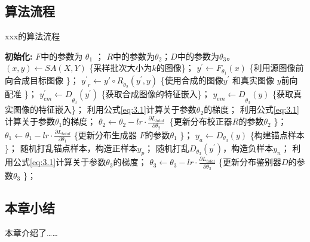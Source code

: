 \subsection{算法流程}

\begin{algorithm}[htb]
		\caption{xxx的算法流程}\label{algo1}
		\setlength{\baselineskip}{18bp}
		\begin{algorithmic}[1]
			\State \textbf{初始化:} $ F $中的参数为 $\theta_1$ ； $ R $中的参数为$ \theta_2 $；$ D $中的参数为$ \theta_3 $。
			\State $ \left(x,y\right)\gets SA\left(X,Y\right) $ \{采样批次大小为$k$的图像\}；
			\State  $ y^{\prime}\gets F_{\theta_1}\left(x\right) $ \{利用源图像前向合成目标图像 \}；
			\State $ {y^\prime}_r\gets{y\prime\circ R}_{\theta_2}\left(y^\prime,y\right) $ \{使用合成的图像$y^{\prime}$ 和真实图像 $ y $前向配准 \}；
			\State $ {y_{em}^{\prime}\gets D}_{\theta_3}\left(y^\prime\right) $ \{获取合成图像的特征嵌入\}；
			\State $ {y_{em}\gets D}_{\theta_3}\left(y\right) $ \{获取真实图像的特征嵌入\}；
			\State 利用公式\ref{eq:3.1}计算关于参数$\theta_2$的梯度；
			\State 利用公式\ref{eq:3.1}计算关于参数$\theta_1$的梯度；
			\State $ \theta_2\gets\theta_2-lr \cdot\frac{\partial L_{total}}{\partial\theta_2}\ $ \{更新分布校正器$ R $的参数$\theta_2$ \}；
			\State $ \theta_1\gets\theta_1-lr\cdot\frac{\partial L_{total}}{\partial\theta_1} $ \{更新分布生成器 $ F $的参数$\theta_1$ \}；
			\State $ y_a\gets D_{\theta_3}\left(y\right) $ \{构建锚点样本 \}；
			\State 随机打乱锚点样本，构造正样本$ y_p $；
			\State 随机打乱$ D_{\theta_3}(y^{\prime}) $，构造负样本$ y_n $；
			\State 利用公式\ref{eq:3.1}计算关于参数$ \theta_3 $的梯度；
			\State $ \theta_3\gets\theta_3-lr\cdot\frac{\partial L_{total}}{\partial\theta_3} $ \{更新分布鉴别器$ D $的参数$\theta_3$ \}；
			\EndWhile
		\end{algorithmic}
	\end{algorithm}

\subsection{本章小结}
本章介绍了……